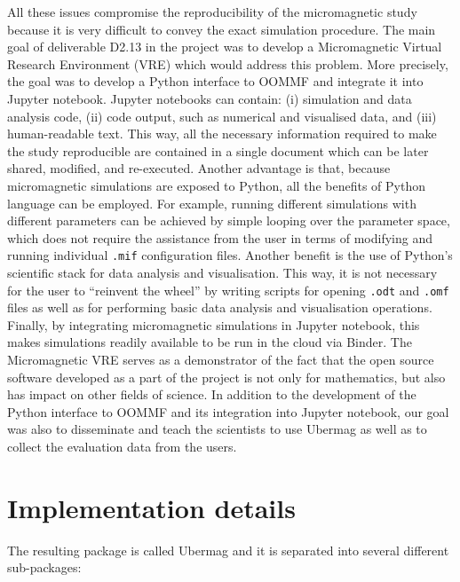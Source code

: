\documentclass{deliverablereport}
\begin{document}
All these issues compromise the reproducibility of the micromagnetic study because it is very difficult to convey the exact simulation procedure. The main goal of deliverable D2.13 in the \ODK project was to develop a Micromagnetic Virtual Research Environment (VRE) which would address this problem. More precisely, the goal was to develop a Python interface to OOMMF and integrate it into Jupyter notebook. Jupyter notebooks can contain: (i) simulation and data analysis code, (ii) code output, such as numerical and visualised data, and (iii) human-readable text. This way, all the necessary information required to make the study reproducible are contained in a single document which can be later shared, modified, and re-executed. Another advantage is that, because micromagnetic simulations are exposed to Python, all the benefits of Python language can be employed. For example, running different simulations with different parameters can be achieved by simple looping over the parameter space, which does not require the assistance from the user in terms of modifying and running individual \texttt{.mif} configuration files. Another benefit is the use of Python's scientific stack for data analysis and visualisation. This way, it is not necessary for the user to ``reinvent the wheel'' by writing scripts for opening \texttt{.odt} and \texttt{.omf} files as well as for performing basic data analysis and visualisation operations. Finally, by integrating micromagnetic simulations in Jupyter notebook, this makes simulations readily available to be run in the cloud via Binder. The Micromagnetic VRE serves as a demonstrator of the fact that the open source software developed as a part of the \ODK project is not only for mathematics, but also has impact on other fields of science. In addition to the development of the Python interface to OOMMF and its integration into Jupyter notebook, our goal was also to disseminate and teach the scientists to use Ubermag as well as to collect the evaluation data from the users.

\section{Implementation details}

The resulting package is called Ubermag and it is separated into several different sub-packages:
\end{document}
